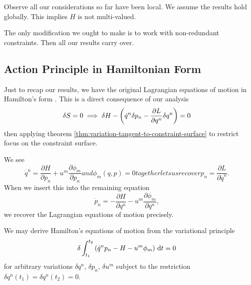 Observe all our considerations so far have been local. We assume the
results hold globally. This implies $H$ is not multi-valued.

The only modification we ought to make is to work with non-redundant
constraints. Then all our results carry over.

\subsection{Action Principle in Hamiltonian Form}
Just to recap our results, we have the original Lagrangian equations of
motion in Hamilton's form
. This is a direct consequence
of our analysis
\begin{equation}
  \delta\action=0%
  \implies\delta H
  -\left(\dot{q}^{n}\delta p_{n}
         -\frac{\partial L}{\partial q^{n}}\delta q^{n}\right)=0
\end{equation}
then applying theorem \ref{thm:variation-tangent-to-constraint-surface}
to restrict focus on the constraint surface.

We see
\begin{subequations}
\begin{equation}
\dot{q}^{n}=\frac{\partial H}{\partial p_{n}} +
u^{m}\frac{\partial\phi_{m}}{\partial p_{n}}
\end{equation}
and
\begin{equation}
\phi_{m}(q,p)=0
\end{equation}
together lets us recover
\begin{equation}
p_{n} = \frac{\partial L}{\partial\dot{q}^{n}}.
\end{equation}
\end{subequations}
When we insert this into the remaining equation
\begin{equation}
\dot{p}_{n} = -\frac{\partial H}{\partial q^{n}}-u^{m}\frac{\partial\phi_{m}}{\partial q^{n}},
\end{equation}
we recover the Lagrangian equations of motion precisely.

We may derive Hamilton's equations of motion from the variational
principle
\begin{equation}
\delta\int^{t_{2}}_{t_{1}}\left(\dot{q}^{n}p_{n}-H-u^{m}\phi_{m}\right)\,\mathrm{d} t=0
\end{equation}
for arbitrary variations $\delta q^{n}$, $\delta p_{n}$, $\delta u^{m}$
subject to the restriction $\delta q^{n}(t_{1})=\delta q^{n}(t_{2})=0$.

